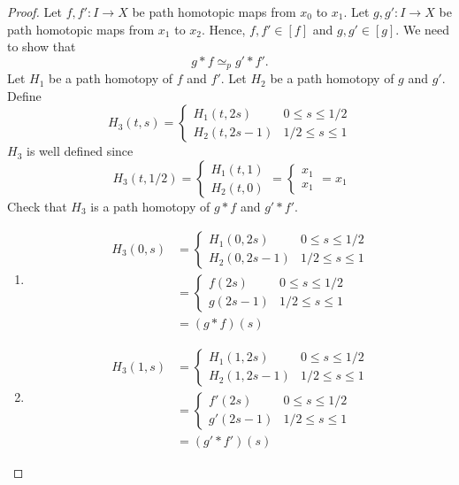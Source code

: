 \begin{proof}
  Let \( f, f': I \to X \) be path homotopic maps
    from \( x_0 \) to \( x_1 \).
  Let \( g, g': I \to X \) be path homotopic maps
    from \( x_1 \) to \( x_2 \).
  Hence, \( f, f' \in [f] \) and \( g, g' \in [g] \).
  We need to show that
    \[
      g * f \simeq_p g' * f'.
    \]
  Let \( H_1 \) be a path homotopy of \( f \) and \( f' \).
  Let \( H_2 \) be a path homotopy of \( g \) and \( g' \).
  Define
  \[
    H_3(t, s) = \begin{cases}
      H_1(t, 2s) & 0 \le s \le 1/2 \\
      H_2(t, 2s -1) & 1/2 \le s \le 1
    \end{cases}
  \]
  \( H_3 \) is well defined since
  \[
    H_3(t, 1/2) = \begin{cases}
      H_1(t, 1) \\
      H_2(t, 0) 
    \end{cases}
    = \begin{cases}
        x_1 \\ x_1
    \end{cases}
    = x_1
  \]
  Check that \( H_3 \) is a path homotopy of 
  \( g * f \) and \( g' * f' \).
  \begin{enumerate}
    \item 
      \begin{align*}
        H_3(0, s) &= \begin{cases}
          H_1(0, 2s) & 0 \le s \le 1/2 \\
          H_2(0, 2s -1) & 1/2 \le s \le 1
          \end{cases} \\
                  &= \begin{cases}
          f(2s) & 0 \le s \le 1/2 \\
          g(2s - 1) & 1/2 \le s \le 1
        \end{cases} \\
                  &= (g * f) (s)
      \end{align*}

    \item 
      \begin{align*}
        H_3(1, s) &= \begin{cases}
          H_1(1, 2s) & 0 \le s \le 1/2 \\
          H_2(1, 2s -1) & 1/2 \le s \le 1
          \end{cases} \\
                  &= \begin{cases}
          f'(2s) & 0 \le s \le 1/2 \\
          g'(2s - 1) & 1/2 \le s \le 1
        \end{cases} \\
                  &= (g' * f') (s)
      \end{align*}
  \end{enumerate}
\end{proof}

